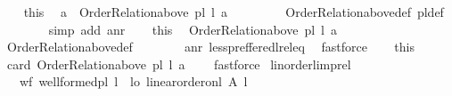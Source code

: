\begin{isabellebody}
\ \ \isamarkupfalse%
\ this\ \isamarkupfalse%
\ {\isachardoublequoteopen}a\ {\isasymnotin}\ Order{\isacharunderscore}{\kern0pt}Relation{\isachardot}{\kern0pt}above\ {\isacharparenleft}{\kern0pt}pl{\isacharunderscore}{\kern0pt}{\isasymalpha}\ l{\isacharparenright}{\kern0pt}\ a{\isachardoublequoteclose}\ \isanewline
\ \ \ \ \ \ \isamarkupfalse%
\ Order{\isacharunderscore}{\kern0pt}Relation{\isachardot}{\kern0pt}above{\isacharunderscore}{\kern0pt}def\ pl{\isacharunderscore}{\kern0pt}{\isasymalpha}{\isacharunderscore}{\kern0pt}def\isanewline
\ \ \ \ \ \ \isamarkupfalse%
\ {\isacharparenleft}{\kern0pt}simp\ add{\isacharcolon}{\kern0pt}\ anr{\isacharparenright}{\kern0pt}\isanewline
\ \ \isamarkupfalse%
\ this\ \isamarkupfalse%
\ {\isachardoublequoteopen}Order{\isacharunderscore}{\kern0pt}Relation{\isachardot}{\kern0pt}above\ {\isacharparenleft}{\kern0pt}pl{\isacharunderscore}{\kern0pt}{\isasymalpha}\ l{\isacharparenright}{\kern0pt}\ a\ {\isacharequal}{\kern0pt}\ {\isacharbraceleft}{\kern0pt}{\isacharbraceright}{\kern0pt}{\isachardoublequoteclose}\ \isanewline
\ \ \ \ \ \ \isamarkupfalse%
\ Order{\isacharunderscore}{\kern0pt}Relation{\isachardot}{\kern0pt}above{\isacharunderscore}{\kern0pt}def\isanewline
\ \ \ \ \ \ \isamarkupfalse%
\ anr\ less{\isacharunderscore}{\kern0pt}preffered{\isacharunderscore}{\kern0pt}l{\isacharunderscore}{\kern0pt}rel{\isacharunderscore}{\kern0pt}eq\ \isamarkupfalse%
\ fastforce\isanewline
\ \ \isamarkupfalse%
\ this\ \isamarkupfalse%
\ {\isachardoublequoteopen}card\ {\isacharparenleft}{\kern0pt}Order{\isacharunderscore}{\kern0pt}Relation{\isachardot}{\kern0pt}above\ {\isacharparenleft}{\kern0pt}pl{\isacharunderscore}{\kern0pt}{\isasymalpha}\ l{\isacharparenright}{\kern0pt}\ a{\isacharparenright}{\kern0pt}\ {\isacharequal}{\kern0pt}\ {}{\isachardoublequoteclose}\ \isamarkupfalse%
\ fastforce\isanewline
{}\isamarkupfalse%
%
\endisatagproof
{\isafoldproof}%
%
\isadelimproof
\isanewline
%
\endisadelimproof
\isanewline
{}\isamarkupfalse%
\ linorder{\isacharunderscore}{\kern0pt}l{\isacharunderscore}{\kern0pt}imp{\isacharunderscore}{\kern0pt}rel{\isacharcolon}{\kern0pt}\isanewline
\ \ \ wf{\isacharcolon}{\kern0pt}\ {\isachardoublequoteopen}well{\isacharunderscore}{\kern0pt}formed{\isacharunderscore}{\kern0pt}pl\ l{\isachardoublequoteclose}\ \ lo{\isacharcolon}{\kern0pt}\ {\isachardoublequoteopen}linear{\isacharunderscore}{\kern0pt}order{\isacharunderscore}{\kern0pt}on{\isacharunderscore}{\kern0pt}l\ A\ l{\isachardoublequoteclose}\isanewline

\end{isabellebody}
